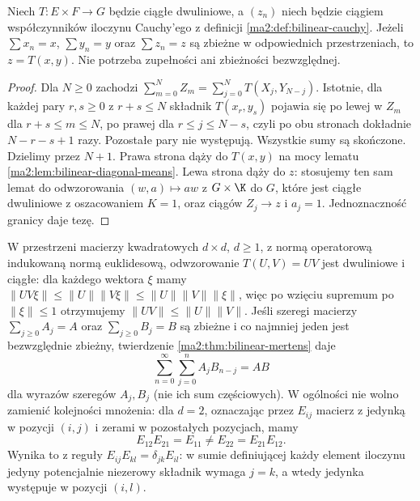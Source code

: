 \begin{twierdzenie}
\label{ma2:thm:bilinear-abel}
Niech $T:E\times F\to G$ będzie ciągłe dwuliniowe,
a $(z_n)$ niech będzie ciągiem współczynników iloczynu
Cauchy'ego z definicji \ref{ma2:def:bilinear-cauchy}.
Jeżeli $\sum x_n=x$, $\sum y_n=y$ oraz $\sum z_n=z$
są zbieżne w odpowiednich przestrzeniach, to $z=T(x,y)$.
Nie potrzeba zupełności ani zbieżności bezwzględnej.
\end{twierdzenie}
\begin{proof}
Dla $N\ge0$ zachodzi
$\sum_{m=0}^N Z_m=\sum_{j=0}^N T(X_j,Y_{N-j})$.
Istotnie, dla każdej pary $r,s\ge0$ z $r+s\le N$
składnik $T(x_r,y_s)$ pojawia się po lewej w $Z_m$
dla $r+s\le m\le N$, po prawej dla $r\le j\le N-s$,
czyli po obu stronach dokładnie $N-r-s+1$ razy.
Pozostałe pary nie występują. Wszystkie sumy są skończone.
Dzielimy przez $N+1$. Prawa strona dąży do $T(x,y)$
na mocy lematu \ref{ma2:lem:bilinear-diagonal-means}.
Lewa strona dąży do $z$: stosujemy ten sam lemat
do odwzorowania $(w,a)\mapsto aw$ z $G\times\K$ do $G$,
które jest ciągłe dwuliniowe z oszacowaniem $K=1$,
oraz ciągów $Z_j\to z$ i $a_j=1$. Jednoznaczność granicy
daje tezę.
\end{proof}

\begin{przyklad}
\label{ma2:ex:matrix-cauchy-product}
W przestrzeni macierzy kwadratowych $d\times d$, $d\ge1$,
z normą operatorową indukowaną normą euklidesową,
odwzorowanie $T(U,V)=UV$ jest dwuliniowe i ciągłe:
dla każdego wektora $\xi$ mamy
$\|UV\xi\|\le\|U\|\|V\xi\|\le\|U\|\|V\|\|\xi\|$,
więc po wzięciu supremum po $\|\xi\|\le1$ otrzymujemy
$\|UV\|\le\|U\|\|V\|$. Jeśli szeregi macierzy $\sum_{j\ge0}A_j=A$ oraz
$\sum_{j\ge0}B_j=B$ są zbieżne i co najmniej jeden
jest bezwzględnie zbieżny,
twierdzenie \ref{ma2:thm:bilinear-mertens} daje
\[
 \sum_{n=0}^\infty\sum_{j=0}^n A_j B_{n-j}=AB
\]
dla wyrazów szeregów $A_j,B_j$ (nie ich sum częściowych).
W ogólności nie wolno zamienić kolejności mnożenia:
dla $d=2$, oznaczając przez $E_{ij}$ macierz z jedynką
w pozycji $(i,j)$ i zerami w pozostałych pozycjach, mamy
\[
 E_{12}E_{21}=E_{11}\ne E_{22}=E_{21}E_{12}.
\]
Wynika to z reguły $E_{ij}E_{kl}=\delta_{jk}E_{il}$:
w sumie definiującej każdy element iloczynu jedyny
potencjalnie niezerowy składnik wymaga $j=k$,
a wtedy jedynka występuje w pozycji $(i,l)$.
\end{przyklad}

